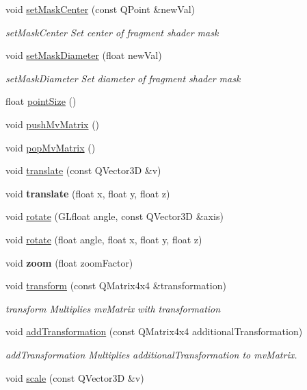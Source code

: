 \begin{DoxyCompactItemize}
void \mbox{\hyperlink{class_g_l_e_s_renderer_aa41f49d92c3514ce90a354cd2127d1c5}{set\+Mask\+Center}} (const Q\+Point \&new\+Val)
\begin{DoxyCompactList}\small\item\em set\+Mask\+Center Set center of fragment shader mask \end{DoxyCompactList}\item 
void \mbox{\hyperlink{class_g_l_e_s_renderer_a07c9bfdc4f16745e9b09529e21184910}{set\+Mask\+Diameter}} (float new\+Val)
\begin{DoxyCompactList}\small\item\em set\+Mask\+Diameter Set diameter of fragment shader mask \end{DoxyCompactList}\item 
float \mbox{\hyperlink{class_g_l_e_s_renderer_a2ba82f565d0a34259614448407cdad11}{point\+Size}} ()
\item 
void \mbox{\hyperlink{class_g_l_e_s_renderer_a712dddd10f14f80a003a347ff1aa1666}{push\+Mv\+Matrix}} ()
\item 
void \mbox{\hyperlink{class_g_l_e_s_renderer_a93ddfbce8f107b0cbc41b2854855202d}{pop\+Mv\+Matrix}} ()
\item 
void \mbox{\hyperlink{class_g_l_e_s_renderer_a252caaa926c2e86312b219454492ffe0}{translate}} (const Q\+Vector3D \&v)
\item 
\mbox{\label{class_g_l_e_s_renderer_a45f1e6f0154b7887289fd8a3aa22908f}} 
void {\bfseries translate} (float x, float y, float z)
\item 
void \mbox{\hyperlink{class_g_l_e_s_renderer_a9e034d2d95eedc35a56f8db1688df163}{rotate}} (G\+Lfloat angle, const Q\+Vector3D \&axis)
\item 
void \mbox{\hyperlink{class_g_l_e_s_renderer_a4e51b730376db41ff15b4a976b258c6e}{rotate}} (float angle, float x, float y, float z)
\item 
\mbox{\label{class_g_l_e_s_renderer_a43e69a0a8c38adf1faae474c33fb7bb8}} 
void {\bfseries zoom} (float zoom\+Factor)
\item 
void \mbox{\hyperlink{class_g_l_e_s_renderer_a8d8a2bac71c26f834b7ce7983204e870}{transform}} (const Q\+Matrix4x4 \&transformation)
\begin{DoxyCompactList}\small\item\em transform Multiplies mv\+Matrix with transformation \end{DoxyCompactList}\item 
void \mbox{\hyperlink{class_g_l_e_s_renderer_a5a523cfef1b63258e863af159c04c235}{add\+Transformation}} (const Q\+Matrix4x4 additional\+Transformation)
\begin{DoxyCompactList}\small\item\em add\+Transformation Multiplies additional\+Transformation to mv\+Matrix. \end{DoxyCompactList}\item 
void \mbox{\hyperlink{class_g_l_e_s_renderer_a4bd22f2f738b185f3b6c3e381c58feca}{scale}} (const Q\+Vector3D \&v)
\end{DoxyCompactItemize}

